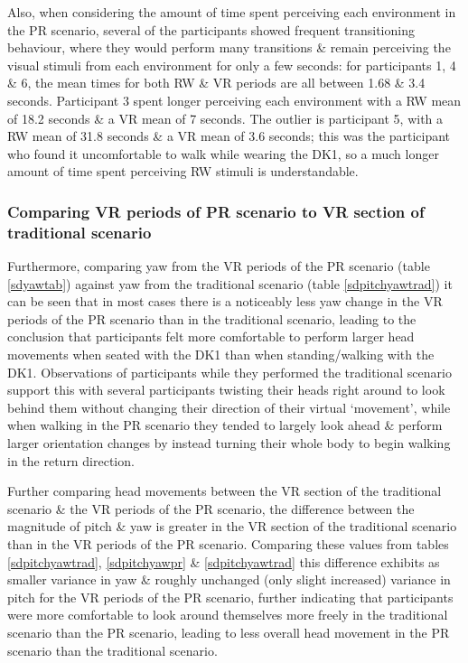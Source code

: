 Also, when considering the amount of time spent perceiving each environment in the PR scenario, several of the participants showed frequent transitioning behaviour, where they would perform many transitions \& remain perceiving the visual stimuli from each environment for only a few seconds: for participants 1, 4 \& 6, the mean times for both RW \& VR periods are all between 1.68 \& 3.4 seconds. Participant 3 spent longer perceiving each environment with a RW mean of 18.2 seconds \& a VR mean of 7 seconds. The outlier is participant 5, with a RW mean of 31.8 seconds \& a VR mean of 3.6 seconds; this was the participant who found it uncomfortable to walk while wearing the DK1, so a much longer amount of time spent perceiving RW stimuli is understandable.

\subsubsection{Comparing VR periods of PR scenario to VR section of traditional scenario}

Furthermore, comparing yaw from the VR periods of the PR scenario (table \ref{sdyawtab}) against yaw from the traditional scenario (table \ref{sdpitchyawtrad}) it can be seen that in most cases there is a noticeably less yaw change in the VR periods of the PR scenario than in the traditional scenario, leading to the conclusion that participants felt more comfortable to perform larger head movements when seated with the DK1 than when standing/walking with the DK1. Observations of participants while they performed the traditional scenario support this with several participants twisting their heads right around to look behind them without changing their direction of their virtual `movement', while when walking in the PR scenario they tended to largely look ahead \& perform larger orientation changes by instead turning their whole body to begin walking in the return direction.

Further comparing head movements between the VR section of the traditional scenario \& the VR periods of the PR scenario, the difference between the magnitude of pitch \& yaw is greater in the VR section of the traditional scenario than in the VR periods of the PR scenario. Comparing these values from tables \ref{sdpitchyawtrad}, \ref{sdpitchyawpr} \& \ref{sdpitchyawtrad} this difference exhibits as smaller variance in yaw \& roughly unchanged (only slight increased) variance in pitch for the VR periods of the PR scenario, further indicating that participants were more comfortable to look around themselves more freely in the traditional scenario than the PR scenario, leading to less overall head movement in the PR scenario than the traditional scenario.

